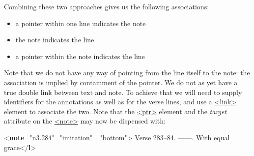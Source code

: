 Combining these two approaches gives us the following associations: \begin{itemize}
\item a pointer within one line indicates the note
\item the note indicates the line
\item a pointer within the note indicates the line
\end{itemize}  Note that we do not have any way of pointing from the line itself to the note: the association is implied by containment of the pointer. We do not as yet have a true double link between text and note. To achieve that we will need to supply identifiers for the annotations as well as for the verse lines, and use a \hyperref[TEI.link]{<link>} element to associate the two. Note that the \hyperref[TEI.ptr]{<ptr>} element and the {\itshape target} attribute on the \hyperref[TEI.note]{<note>} may now be dispensed with: \par\bgroup{}\exampleFont \begin{shaded}\noindent\mbox{}{<\textbf{note}\hspace*{1em}{xml:id}="{n3.284}"\hspace*{1em}{type}="{imitation}"\mbox{}\newline 
\hspace*{1em}{place}="{bottom}">}\mbox{}\newline 
{}Verse 283–84.\mbox{}\newline 
{}\mbox{}\newline 
\hspace*{1em}\hspace*{1em}——. With equal grace{</\textbf{l}>}\mbox{}\newline 

\end{shaded}
